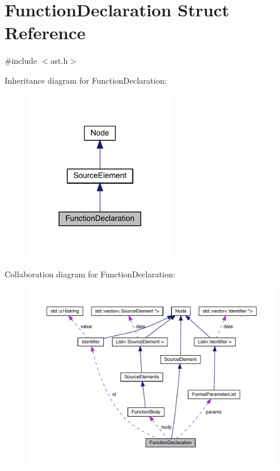 \hypertarget{struct_function_declaration}{}\section{Function\+Declaration Struct Reference}
\label{struct_function_declaration}


{\ttfamily \#include $<$ast.\+h$>$}



Inheritance diagram for Function\+Declaration\+:\nopagebreak
\begin{figure}[H]
\begin{center}
\leavevmode
\includegraphics[width=185pt]{struct_function_declaration__inherit__graph}
\end{center}
\end{figure}


Collaboration diagram for Function\+Declaration\+:
\nopagebreak
\begin{figure}[H]
\begin{center}
\leavevmode
\includegraphics[width=350pt]{struct_function_declaration__coll__graph}
\end{center}
\end{figure}
